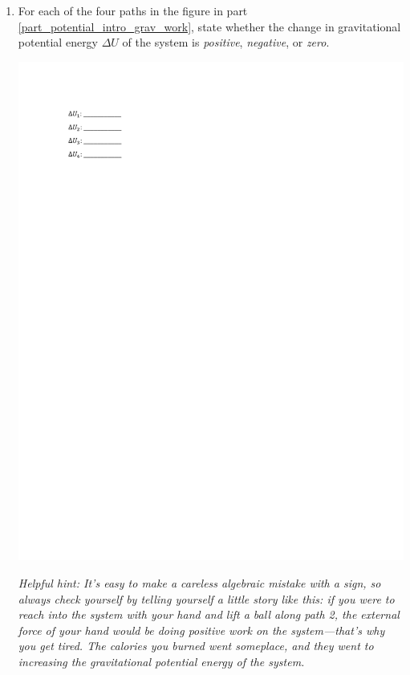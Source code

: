 \begin{enumerate}[labparts]
\item For each of the four paths in the figure in part \ref{part_potential_intro_grav_work}, state whether the change in gravitational potential energy $\Delta U$ of the system is \textit{positive}, \textit{negative}, or \textit{zero}.
\begin{center}
\vspace{0.05in}
\includegraphics{potential_intro/activity_1_figs/gravity_potentials.pdf}
\vspace{0.05in}
\end{center}

\textit{Helpful hint: It's easy to make a careless algebraic mistake with a sign, so always check yourself by telling yourself a little story like this: if you were to reach into the system with your hand and lift a ball along path 2, the external force of your hand would be doing \textit{positive} work on the system---that's why you get tired.  The calories you burned went someplace, and they went to \textit{increasing} the gravitational potential energy of the system. }


\end{enumerate}
